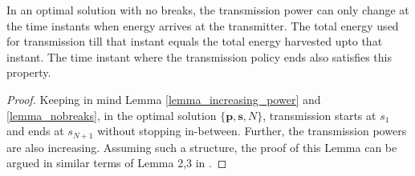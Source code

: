 \begin{lemma}
In an optimal solution with no breaks, the transmission power can only change at the time instants when energy arrives at the transmitter. The total energy used for transmission till that instant equals the total energy harvested upto that instant. The time instant where the transmission policy ends also satisfies this property.
\label{lemma_energy_consumed} 
\end{lemma}
\begin{proof}
Keeping in mind Lemma \ref{lemma_increasing_power} and \ref{lemma_nobreaks}, in the optimal solution $\{\textbf{p}, \textbf{s}, N\}$, transmission starts at $s_1$ and ends at $s_{N+1}$ without stopping in-between. Further, the transmission powers are also increasing. Assuming such a structure, the proof of this Lemma can be argued in similar terms of Lemma 2,3 in \cite{Yang}. 
\end{proof}	

